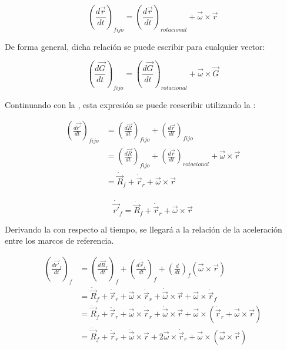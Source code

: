 \documentclass[/home/hernan/Documentos/Apuntes_mecanica_teorica/main.tex]{subfiles}
\begin{document}
	\begin{equation}
		\left( \frac{d \vec{r}}{dt} \right)_{fijo} = \left( \frac{d \vec{r}}{dt} \right)_{rotacional} + \vec{\omega} \times \vec{r}
		\label{eq: inertialnoinertialr}
	\end{equation}

	De forma general, dicha relación se puede escribir para cualquier vector:

	\begin{equation}
		\left( \frac{d \vec{G}}{dt} \right)_{fijo} = \left( \frac{d \vec{G}}{dt} \right)_{rotacional} + \vec{\omega} \times \vec{G}
		\label{eq: inertialnoinertialG}
	\end{equation}

	Continuando con la , esta expresión se puede reescribir utilizando la :

	\begin{align*}
		\left( \frac{d \vec{{r}'}}{dt} \right)_{fijo} & = \left( \frac{d \vec{R}}{dt} \right)_{fijo} + \left( \frac{d \vec{r}}{dt} \right)_{fijo} \\ 
		& = \left( \frac{d \vec{R}}{dt} \right)_{fijo} + \left( \frac{d \vec{r}}{dt} \right)_{rotacional} + \vec{\omega} \times \vec{r} \\ 
		& = \dot{\vec{R}}_{f} + \dot{ \vec{r}}_{r} + \vec{\omega} \times \vec{r} \\ 
	\end{align*}

	\begin{definition}
		\begin{equation}
			\dot{ \vec{{r}'}}_{f} = \dot{\vec{R}}_{f} + \dot{ \vec{r}}_{r} + \vec{\omega} \times \vec{r}
			\label{eq: vinirelation}
		\end{equation}
	\end{definition}


	Derivando la  con respecto al tiempo, se llegará a la relación de la aceleración entre los marcos de referencia.

	\begin{align*}
		\left(\frac{d \dot{ \vec{{r}'}}_{f} }{dt}\right)_{f} &= \left(\frac{d  \dot{\vec{R}}_{f} }{dt}\right)_{f} + \left(\frac{d  \dot{ \vec{r}}_{r}}{dt}\right)_{f} + \left(\frac{d  }{dt}\right)_{f} \left( \vec{\omega} \times \vec{r} \right) \\ 
		& = \ddot{\vec{R}}_{f} + \ddot{ \vec{r}}_{r} + \vec{\omega} \times \dot{ \vec{r}}_{r} + \dot{\vec{\omega}} \times \vec{r} + \vec{\omega} \times \dot{\vec{r}}_{f} \\
		& = \ddot{\vec{R}}_{f} + \ddot{ \vec{r}}_{r} + \vec{\omega} \times \dot{ \vec{r}}_{r} + \dot{\vec{\omega}} \times \vec{r} + \vec{\omega} \times \left(\dot{\vec{r}}_{r} + \vec{\omega} \times \vec{r} \right) \\ 
		& = \ddot{\vec{R}}_{f} + \ddot{ \vec{r}}_{r} + \dot{\vec{\omega}} \times \vec{r}  + 2\vec{\omega} \times \dot{ \vec{r}}_{r} + \vec{\omega} \times \left( \vec{\omega} \times \vec{r}  \right)
	\end{align*}
\end{document}
